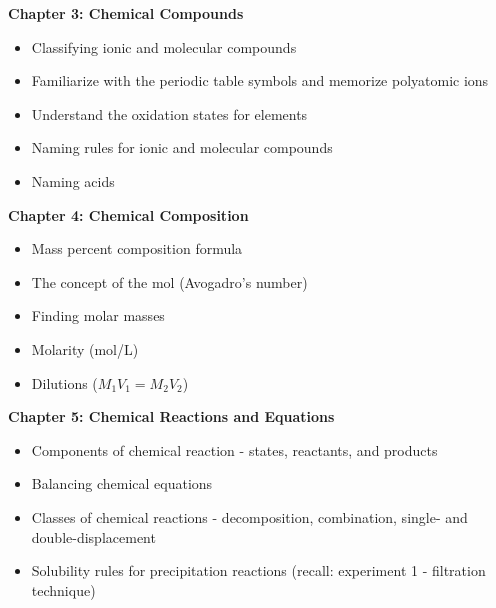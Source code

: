 \documentclass[12pt]{article}
\begin{document}
\textbf{Chapter 3: Chemical Compounds}

\begin{itemize}
  \setlength\itemsep{0em}
\item Classifying ionic and molecular compounds
\item Familiarize with the periodic table symbols
  and memorize polyatomic ions
\item Understand the oxidation states for elements
\item Naming rules for ionic and molecular compounds
\item Naming acids
\end{itemize}

\textbf{Chapter 4: Chemical Composition}

\begin{itemize}
  \setlength\itemsep{0em}
\item Mass percent composition formula
\item The concept of the mol (Avogadro's number)
\item Finding molar masses
\item Molarity (mol/L)
\item Dilutions ($M_1V_1 = M_2V_2$)
\end{itemize}

\textbf{Chapter 5: Chemical Reactions and Equations}

\begin{itemize}
  \setlength\itemsep{0em}
\item Components of chemical reaction - states, reactants, and
  products
\item Balancing chemical equations
\item Classes of chemical reactions - decomposition, combination,
  single- and double-displacement
\item Solubility rules for precipitation reactions (recall: experiment 1
  - filtration technique)
\end{itemize}
\end{document}
